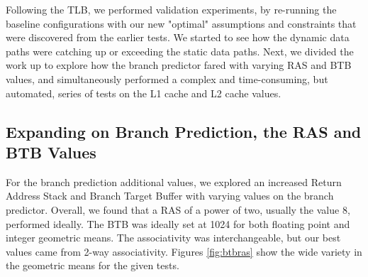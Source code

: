 \documentclass[paper=a4, fontsize=12pt]{scrartcl} %
\numberwithin{equation}{section} %
\numberwithin{figure}{section} %
\numberwithin{table}{section} %
\begin{document}
Following the TLB, we performed validation experiments, by re-running the baseline configurations with our new "optimal" assumptions and constraints that were discovered from the earlier tests. We started to see how the dynamic data paths were catching up or exceeding the static data paths. Next, we divided the work up to explore how the branch predictor fared with varying RAS and BTB values, and simultaneously performed a complex and time-consuming, but automated, series of tests on the L1 cache and L2 cache values.


\subsection{Expanding on Branch Prediction, the RAS and BTB Values}

For the branch prediction additional values, we explored an increased Return Address Stack and Branch Target Buffer with varying values on the branch predictor. Overall, we found that a RAS of a power of two, usually the value 8, performed ideally. The BTB was ideally set at 1024 for both floating point and integer geometric means. The associativity was interchangeable, but our best values came from 2-way associativity. Figures \ref{fig:btbras} show the wide variety in the geometric means for the given tests.
\end{document}

